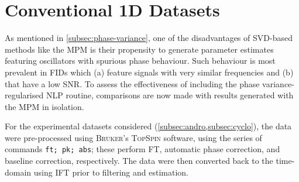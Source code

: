 \section{Conventional \ac{1D} Datasets}
\label{sec:evaluation}

As mentioned in \cref{subsec:phase-variance}, one of the disadvantages of
\ac{SVD}-based methods like the \ac{MPM} is their propensity to generate
parameter estimates featuring oscillators with spurious phase behaviour. Such
behaviour is most prevalent in \acp{FID} which (a) feature signals with very
similar frequencies and (b) that have a low \ac{SNR}.
To assess the effectiveness of including the phase variance-regularised
\ac{NLP} routine, comparisons are now made with results generated with the
\ac{MPM} in isolation.

For the experimental datasets considered (\cref{subsec:andro,subsec:cyclo}),
the data were pre-processed using \textsc{Bruker}'s \textsc{TopSpin} software,
using the series of commands \texttt{ft; pk; abs}; these perform \ac{FT},
automatic phase correction, and baseline correction, respectively.
The data were
then converted back to the time-domain using \ac{IFT} prior to filtering and
estimation. \label{corr:onedim-timings}


